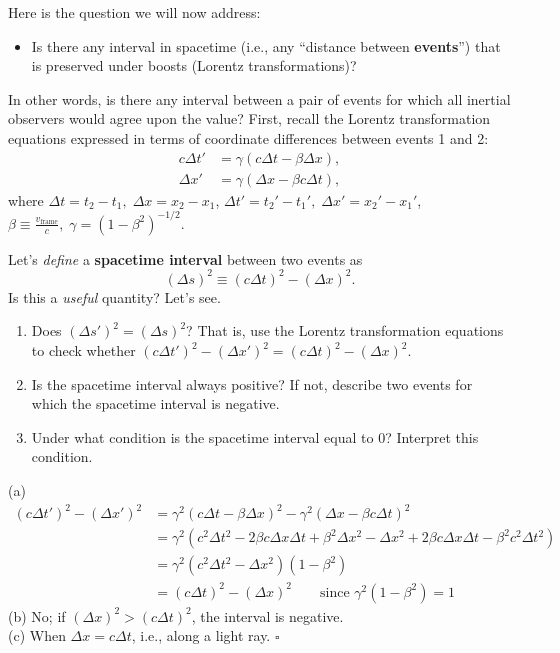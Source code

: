 \documentclass[11pt, letterpaper, openany]{book}
\newenvironment{exercise}[1][Exercise]{%
  \tcolorbox[blanker, breakable, left=1em,
    before skip=1em, after skip=1em,
    borderline west={3pt}{0pt}{PhysNavy},
    colback=PhysCream,
    before upper={\textcolor{PhysNavy}{\sffamily\bfseries #1:}\space}
  ]%
}{%
  \endtcolorbox%
}
\newenvironment{solution}[1][Solution]{%
  \tcolorbox[blanker, breakable, left=1em,
    before skip=1em, after skip=1em,
    borderline west={2pt}{0pt}{PhysTeal},
    colback=PhysCream,
    before upper={\textcolor{PhysTeal}{\sffamily\bfseries #1.}\space}
  ]%
}{%
  \hfill\textcolor{PhysTeal}{\ensuremath{\square}}\endtcolorbox%
}
\begin{document}
Here is the question we will now address:
\begin{itemize}
    \item Is there any interval in spacetime (i.e., any ``distance between \textbf{events}'') that is preserved under boosts (Lorentz transformations)?
\end{itemize}

In other words, is there any interval between a pair of events for which all inertial observers would agree upon the value? First, recall the Lorentz transformation equations expressed in terms of coordinate differences between events 1 and 2:
\begin{align*}
    c\Delta t' &= \gamma(c\Delta t - \beta \Delta x), \\
    \Delta x'  &= \gamma(\Delta x - \beta c\Delta t),
\end{align*}
where $\Delta t = t_2 - t_1, \; \Delta x = x_2 - x_1$, $\Delta t' = t_2' - t_1', \; \Delta x' = x_2' - x_1'$, $\beta \equiv \frac{v_{\text{frame}}}{c}, \; \gamma = (1 - \beta^2)^{-1/2}$.

\begin{exercise}[Exercise 2]
Let's \textit{define} a \textbf{spacetime interval} between two events as
\[ (\Delta s)^2 \equiv (c\Delta t)^2 - (\Delta x)^2. \]
Is this a \textit{useful} quantity? Let's see.
\begin{enumerate}[label=(\alph*)]
    \item Does $(\Delta s')^2 = (\Delta s)^2$? That is, use the Lorentz transformation equations to check whether $(c\Delta t')^2 - (\Delta x')^2 = (c\Delta t)^2 - (\Delta x)^2$.
    \item Is the spacetime interval always positive? If not, describe two events for which the spacetime interval is negative.
    \item Under what condition is the spacetime interval equal to 0? Interpret this condition.
\end{enumerate}
\end{exercise}

\begin{solution}
(a)
\begin{align*}
    (c\Delta t')^2 - (\Delta x')^2 &= \gamma^2(c\Delta t - \beta \Delta x)^2 - \gamma^2(\Delta x - \beta c\Delta t)^2 \\
    &= \gamma^2 \left( c^2\Delta t^2 - 2\beta c\Delta x\Delta t + \beta^2\Delta x^2 - \Delta x^2 + 2\beta c\Delta x\Delta t - \beta^2 c^2\Delta t^2 \right) \\
    &= \gamma^2 \left( c^2\Delta t^2 - \Delta x^2 \right) (1-\beta^2) \\
    &= (c\Delta t)^2 - (\Delta x)^2 \qquad \text{since } \gamma^2(1-\beta^2) = 1
\end{align*}
(b) No; if $(\Delta x)^2 > (c\Delta t)^2$, the interval is negative. \\
(c) When $\Delta x = c\Delta t$, i.e., along a light ray.
\end{solution}
\end{document}
